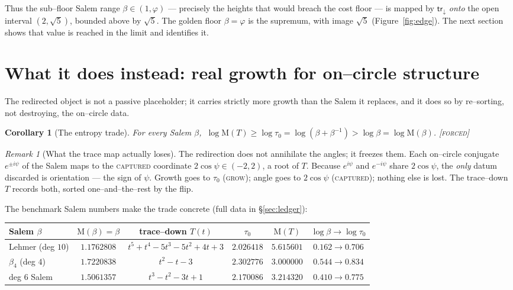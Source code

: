\documentclass[11pt]{article}
\theoremstyle{plain}
\newtheorem{corollary}[theorem]{Corollary}
\theoremstyle{definition}
\theoremstyle{remark}
\newtheorem{remark}[theorem]{Remark}
\newcommand{\forced}{\textcolor{forcedc}{\textsc{[forced]}}}
\newcommand{\Mah}{\mathrm{M}}
\newcommand{\trace}{\mathsf{tr}_{\!\downarrow}}
\begin{document}
Thus the sub--floor Salem range $\beta\in(1,\varphi)$ --- precisely the heights that would breach the cost floor --- is mapped by $\trace$ \emph{onto} the open interval $(2,\sqrt5)$, bounded above by $\sqrt5$. The golden floor $\beta=\varphi$ is the supremum, with image $\sqrt5$ (Figure~\ref{fig:edge}). The next section shows that value is reached in the limit and identifies it.

\section{What it does instead: real growth for on--circle structure}\label{sec:does}

The redirected object is not a passive placeholder; it carries strictly more growth than the Salem it replaces, and it does so by re--sorting, not destroying, the on--circle data.

\begin{corollary}[The entropy trade]\label{cor:entropy}
For every Salem $\beta$, $\ \log\Mah(T)\ge\log\tau_0=\log(\beta+\beta^{-1})>\log\beta=\log\Mah(\beta)$. \forced
\end{corollary}

\begin{remark}[What the trace map actually loses]\label{rem:loses}
The redirection does not annihilate the angles; it freezes them. Each on--circle conjugate $e^{\pm i\psi}$ of the Salem maps to the \textsc{captured} coordinate $2\cos\psi\in(-2,2)$, a root of $T$. Because $e^{i\psi}$ and $e^{-i\psi}$ share $2\cos\psi$, the \emph{only} datum discarded is orientation --- the sign of $\psi$. Growth goes to $\tau_0$ (\textsc{grow}); angle goes to $2\cos\psi$ (\textsc{captured}); nothing else is lost. The trace--down $T$ records both, sorted one--and--the--rest by the flip.
\end{remark}

The benchmark Salem numbers make the trade concrete (full data in \S\ref{sec:ledger}):
\begin{center}
\renewcommand{\arraystretch}{1.15}
\begin{tabular}{@{}lccccc@{}}
\toprule
Salem $\beta$ & $\Mah(\beta)=\beta$ & trace--down $T(t)$ & $\tau_0$ & $\Mah(T)$ & $\log\beta\to\log\tau_0$\\
\midrule
Lehmer (deg $10$) & $1.1762808$ & $t^5{+}t^4{-}5t^3{-}5t^2{+}4t{+}3$ & $2.026418$ & $5.615601$ & $0.162\to0.706$\\
$\beta_4$ (deg $4$)& $1.7220838$ & $t^2-t-3$ & $2.302776$ & $3.000000$ & $0.544\to0.834$\\
deg $6$ Salem & $1.5061357$ & $t^3-t^2-3t+1$ & $2.170086$ & $3.214320$ & $0.410\to0.775$\\
\bottomrule
\end{tabular}
\end{center}
\end{document}
